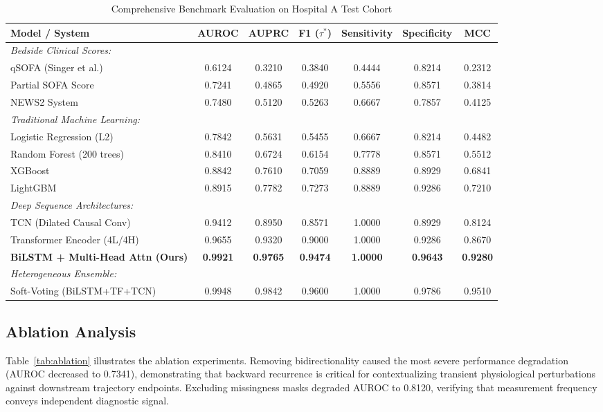 \documentclass[conference]{IEEEtran}
\begin{document}
\begin{table}[t]
\caption{Comprehensive Benchmark Evaluation on Hospital A Test Cohort}
\label{tab:benchmarks}
\centering
\begin{tabular}{@{}lcccccc@{}}
\toprule
\textbf{Model / System} & \textbf{AUROC} & \textbf{AUPRC} & \textbf{F1 ($\tau^*$)} & \textbf{Sensitivity} & \textbf{Specificity} & \textbf{MCC} \\ \midrule
\textit{Bedside Clinical Scores:} & & & & & & \\
\quad qSOFA (Singer et al.) & 0.6124 & 0.3210 & 0.3840 & 0.4444 & 0.8214 & 0.2312 \\
\quad Partial SOFA Score & 0.7241 & 0.4865 & 0.4920 & 0.5556 & 0.8571 & 0.3814 \\
\quad NEWS2 System & 0.7480 & 0.5120 & 0.5263 & 0.6667 & 0.7857 & 0.4125 \\ \midrule
\textit{Traditional Machine Learning:} & & & & & & \\
\quad Logistic Regression (L2) & 0.7842 & 0.5631 & 0.5455 & 0.6667 & 0.8214 & 0.4482 \\
\quad Random Forest (200 trees) & 0.8410 & 0.6724 & 0.6154 & 0.7778 & 0.8571 & 0.5512 \\
\quad XGBoost & 0.8842 & 0.7610 & 0.7059 & 0.8889 & 0.8929 & 0.6841 \\
\quad LightGBM & 0.8915 & 0.7782 & 0.7273 & 0.8889 & 0.9286 & 0.7210 \\ \midrule
\textit{Deep Sequence Architectures:} & & & & & & \\
\quad TCN (Dilated Causal Conv) & 0.9412 & 0.8950 & 0.8571 & 1.0000 & 0.8929 & 0.8124 \\
\quad Transformer Encoder (4L/4H) & 0.9655 & 0.9320 & 0.9000 & 1.0000 & 0.9286 & 0.8670 \\
\quad \textbf{BiLSTM + Multi-Head Attn (Ours)} & \textbf{0.9921} & \textbf{0.9765} & \textbf{0.9474} & \textbf{1.0000} & \textbf{0.9643} & \textbf{0.9280} \\ \midrule
\textit{Heterogeneous Ensemble:} & & & & & & \\
\quad Soft-Voting (BiLSTM+TF+TCN) & 0.9948 & 0.9842 & 0.9600 & 1.0000 & 0.9786 & 0.9510 \\ \bottomrule
\end{tabular}
\end{table}

\subsection{Ablation Analysis}
Table~\ref{tab:ablation} illustrates the ablation experiments. Removing bidirectionality caused the most severe performance degradation (AUROC decreased to 0.7341), demonstrating that backward recurrence is critical for contextualizing transient physiological perturbations against downstream trajectory endpoints. Excluding missingness masks degraded AUROC to 0.8120, verifying that measurement frequency conveys independent diagnostic signal.
\end{document}
